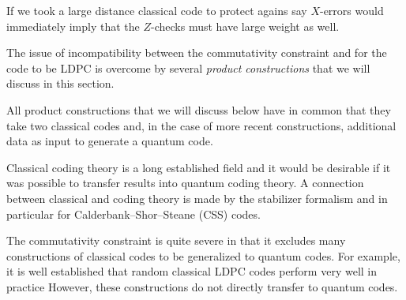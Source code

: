 If we took a large distance classical code to protect agains say $X$-errors  would immediately imply that the $Z$-checks must have large weight as well.

The issue of incompatibility between the commutativity constraint and for the code to be LDPC is overcome by several \emph{product constructions} that we will discuss in this section.

All product constructions that we will discuss below have in common that they take two classical codes and, in the case of more recent constructions, additional data as input to generate a quantum code.


Classical coding theory is a long established field and it would be desirable if it was possible to transfer results into quantum coding theory.
A connection between classical and coding theory is made by the stabilizer formalism and in particular for Calderbank--Shor--Steane (CSS) codes.

The commutativity constraint is quite severe in that it excludes many constructions of classical codes to be generalized to quantum codes. %
For example, it is well established that random classical LDPC codes perform very well in practice %
However, these constructions do not directly transfer to quantum codes.





